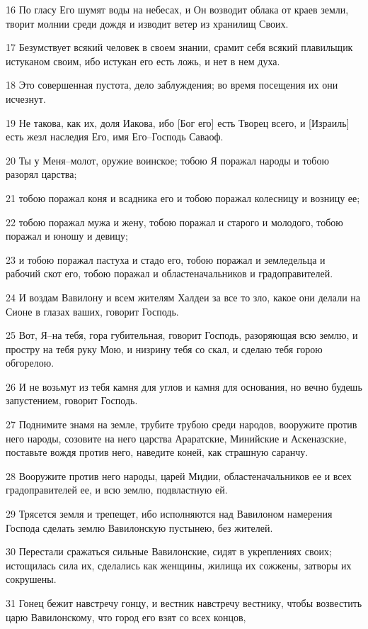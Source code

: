 \par 16 По гласу Его шумят воды на небесах, и Он возводит облака от краев земли, творит молнии среди дождя и изводит ветер из хранилищ Своих.
\par 17 Безумствует всякий человек в своем знании, срамит себя всякий плавильщик истуканом своим, ибо истукан его есть ложь, и нет в нем духа.
\par 18 Это совершенная пустота, дело заблуждения; во время посещения их они исчезнут.
\par 19 Не такова, как их, доля Иакова, ибо [Бог его] есть Творец всего, и [Израиль] есть жезл наследия Его, имя Его--Господь Саваоф.
\par 20 Ты у Меня--молот, оружие воинское; тобою Я поражал народы и тобою разорял царства;
\par 21 тобою поражал коня и всадника его и тобою поражал колесницу и возницу ее;
\par 22 тобою поражал мужа и жену, тобою поражал и старого и молодого, тобою поражал и юношу и девицу;
\par 23 и тобою поражал пастуха и стадо его, тобою поражал и земледельца и рабочий скот его, тобою поражал и областеначальников и градоправителей.
\par 24 И воздам Вавилону и всем жителям Халдеи за все то зло, какое они делали на Сионе в глазах ваших, говорит Господь.
\par 25 Вот, Я--на тебя, гора губительная, говорит Господь, разоряющая всю землю, и простру на тебя руку Мою, и низрину тебя со скал, и сделаю тебя горою обгорелою.
\par 26 И не возьмут из тебя камня для углов и камня для основания, но вечно будешь запустением, говорит Господь.
\par 27 Поднимите знамя на земле, трубите трубою среди народов, вооружите против него народы, созовите на него царства Араратские, Минийские и Аскеназские, поставьте вождя против него, наведите коней, как страшную саранчу.
\par 28 Вооружите против него народы, царей Мидии, областеначальников ее и всех градоправителей ее, и всю землю, подвластную ей.
\par 29 Трясется земля и трепещет, ибо исполняются над Вавилоном намерения Господа сделать землю Вавилонскую пустынею, без жителей.
\par 30 Перестали сражаться сильные Вавилонские, сидят в укреплениях своих; истощилась сила их, сделались как женщины, жилища их сожжены, затворы их сокрушены.
\par 31 Гонец бежит навстречу гонцу, и вестник навстречу вестнику, чтобы возвестить царю Вавилонскому, что город его взят со всех концов,
